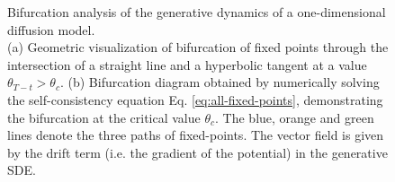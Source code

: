 \documentclass{article}
\begin{document}
\begin{figure}
     \centering
     \caption{Bifurcation analysis of the generative dynamics of a one-dimensional diffusion model.\\ (a) Geometric visualization of bifurcation of fixed points through the intersection of a straight line and a hyperbolic tangent at a value $\theta_{T-t} > \theta_c$. (b) Bifurcation diagram obtained by numerically solving the self-consistency equation Eq. \ref{eq:all-fixed-points}, demonstrating the bifurcation at the critical value $\theta_c$. The blue, orange and green lines denote the three paths of fixed-points. The vector field is given by the drift term (i.e. the gradient of the potential) in the generative SDE.}
     \label{fig:three_graphs}
\end{figure}
\end{document}
